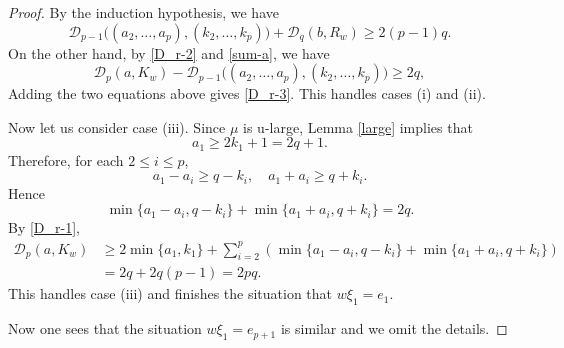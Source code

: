 \documentclass[11pt]{amsart}
\theoremstyle{plain}
\theoremstyle{definition}
\newcommand{\caD}{\mathcal{D}}
\begin{document}
\begin{proof}
By the induction hypothesis, we have
$$
\caD_{p-1}\big((a_2,\dots,a_p), (k_2,\dots,k_p)\big)+\caD_q(b,R_w)\ge 2(p-1)q.
$$
On the other hand,
by \eqref{D_r-2} and \eqref{sum-a}, we have
$$
\caD_{p}(a,K_w)-\caD_{p-1}\big((a_2,\dots,a_p),(k_2,\dots,k_p)\big)\ge 2q,
$$
Adding the two equations above gives \eqref{D_r-3}. This handles cases (i) and (ii).
	
Now let us consider case (iii). Since $\mu$ is u-large, Lemma \ref{large} implies that
$$
a_1\ge 2k_1+1=2q+1.
$$
Therefore, for each $2\le i\le p$,
	\[a_1-a_i\ge q-k_i,\quad a_1+a_i\ge q+k_i.\]
	Hence
	\[\min\{a_1-a_i,q-k_i\}+\min\{a_1+a_i,q+k_i\}=2q.\]
	By \eqref{D_r-1},
	\begin{align*}
		\caD_p(a,K_w)&\ge 2\min\{a_1, k_1\}+\sum_{i=2}^p(\min\{a_1-a_i, q-k_i\}+\min\{a_1+a_i, q+k_i\})\\
		&=2q+2q(p-1)=2pq.
	\end{align*}
	This handles case (iii) and finishes the situation that $w \xi_1=e_1$.
	
	Now one sees that the situation $w\xi_1=e_{p+1}$ is similar and we omit the details.
\end{proof}
\end{document}
